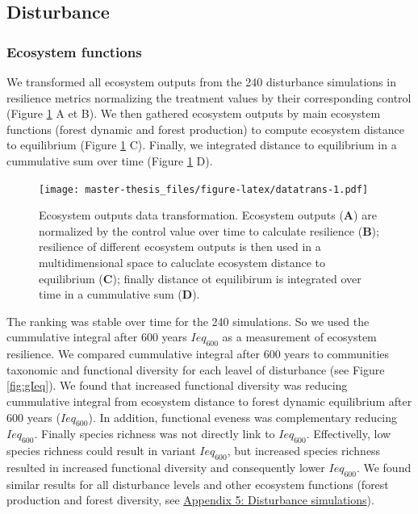 \documentclass[12pt,]{article}
\theoremstyle{definition}
\theoremstyle{definition}
\theoremstyle{remark}
\begin{document}
\subsection{Disturbance}\label{disturbance-1}

\subsubsection{Ecosystem functions}\label{ecosystem-functions-1}

We transformed all ecosystem outputs from the 240 disturbance
simulations in resilience metrics normalizing the treatment values by
their corresponding control (Figure \ref{fig:datatrans} A et B). We then
gathered ecosystem outputs by main ecosystem functions (forest dynamic
and forest production) to compute ecosystem distance to equilibrium
(Figure \ref{fig:datatrans} C). Finally, we integrated distance to
equilibrium in a cummulative sum over time (Figure \ref{fig:datatrans}
D).

\begin{figure}[htbp]
\centering
\texttt{[image: master-thesis\_files/figure-latex/datatrans-1.pdf]}
\caption{\label{fig:datatrans}Ecosystem outputs data transformation.
Ecosystem outputs (\textbf{A}) are normalized by the control value over
time to calculate resilience (\textbf{B}); resilience of different
ecosystem outputs is then used in a multidimensional space to caluclate
ecosystem distance to equilibrium (\textbf{C}); finally distance ot
equilibirum is integrated over time in a cummulative sum (\textbf{D}).}
\end{figure}

The ranking was stable over time for the 240 simulations. So we used the
cummulative integral after 600 years \(Ieq_{600}\) as a measurement of
ecosystem resilience. We compared cummulative integral after 600 years
to communities taxonomic and functional diversity for each leavel of
disturbance (see Figure \ref{fig:gIeq}). We found that increased
functional diversity \citep[FDiv,][]{villeger_new_2008} was reducing
cummulative integral from ecosystem distance to forest dynamic
equilibrium after 600 years (\(Ieq_{600}\)). In addition, functional
eveness was complementary reducing \(Ieq_{600}\). Finally species
richness was not directly link to \(Ieq_{600}\). Effectivelly, low
species richness could result in variant \(Ieq_{600}\), but increased
species richness resulted in increased functional diversity and
consequently lower \(Ieq_{600}\). We found similar results for all
disturbance levels and other ecosystem functions (forest production and
forest diversity, see
\protect\hyperlink{appendix-5-disturbance-simulations}{Appendix 5:
Disturbance simulations}).
\end{document}
